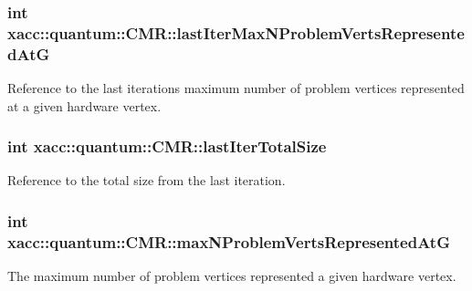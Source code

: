\subsubsection[{\texorpdfstring{last\+Iter\+Max\+N\+Problem\+Verts\+Represented\+AtG}{lastIterMaxNProblemVertsRepresentedAtG}}]{\setlength{\rightskip}{0pt plus 5cm}int xacc\+::quantum\+::\+C\+M\+R\+::last\+Iter\+Max\+N\+Problem\+Verts\+Represented\+AtG\hspace{0.3cm}{\ttfamily [protected]}}\hypertarget{a00032_aa3a607bf9eeedbc43cfa37624ac57ecd}{}\label{a00032_aa3a607bf9eeedbc43cfa37624ac57ecd}
Reference to the last iterations maximum number of problem vertices represented at a given hardware vertex. 
\subsubsection[{\texorpdfstring{last\+Iter\+Total\+Size}{lastIterTotalSize}}]{\setlength{\rightskip}{0pt plus 5cm}int xacc\+::quantum\+::\+C\+M\+R\+::last\+Iter\+Total\+Size\hspace{0.3cm}{\ttfamily [protected]}}\hypertarget{a00032_a5d970ff227505a02cee0a331df66f5a0}{}\label{a00032_a5d970ff227505a02cee0a331df66f5a0}
Reference to the total size from the last iteration. 
\subsubsection[{\texorpdfstring{max\+N\+Problem\+Verts\+Represented\+AtG}{maxNProblemVertsRepresentedAtG}}]{\setlength{\rightskip}{0pt plus 5cm}int xacc\+::quantum\+::\+C\+M\+R\+::max\+N\+Problem\+Verts\+Represented\+AtG\hspace{0.3cm}{\ttfamily [protected]}}\hypertarget{a00032_a0bfae593986c4b99fcfc5c7d58cb03d3}{}\label{a00032_a0bfae593986c4b99fcfc5c7d58cb03d3}
The maximum number of problem vertices represented a given hardware vertex. 
